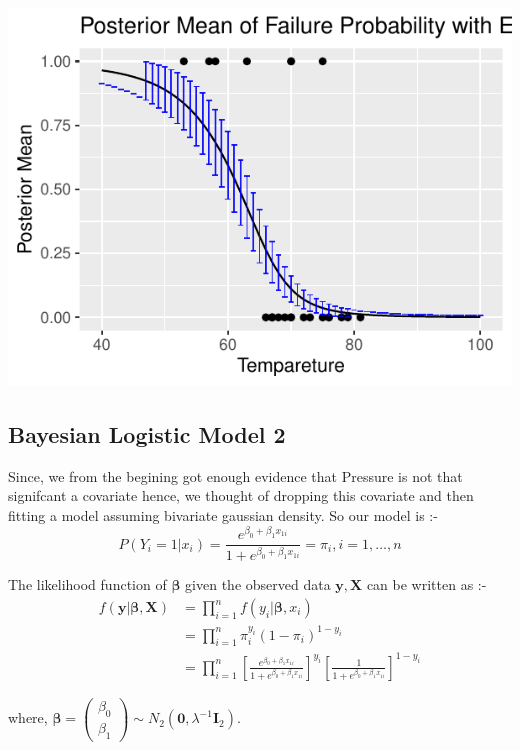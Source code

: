 \documentclass[11pt,english]{article}\usepackage[]{graphicx}\usepackage[]{xcolor}
\makeatletter
\def\maxwidth{ %
  \ifdim\Gin@nat@width>\linewidth
    \linewidth
  \else
    \Gin@nat@width
  \fi
}
\newenvironment{knitrout}{}{} %
\makeatother
\begin{document}
\begin{center}
\begin{knitrout}
\includegraphics[width=\maxwidth]{figure/unnamed-chunk-16-1} 
\end{knitrout}
\par\end{center}
\author{\pagebreak}

\subsection*{Bayesian Logistic Model 2}

Since, we from the begining got enough evidence that Pressure is not
that signifcant a covariate hence, we thought of dropping this covariate
and then fitting a model assuming bivariate gaussian density. So our
model is :-
\[
P\left(Y_{i}=1|x_{i}\right)=\frac{e^{\beta_{0}+\beta_{1}x_{1i}}}{1+e^{\beta_{0}+\beta_{1}x_{1i}}}=\pi_{i},i=1,\dots,n
\]

The likelihood function of $\boldsymbol{\beta}$ given the observed
data $\boldsymbol{y,X}$ can be written as :-
\begin{align*}
f\left(\boldsymbol{y}|\boldsymbol{\beta},\boldsymbol{X}\right) & =\prod_{i=1}^{n}f\left(y_{i}|\boldsymbol{\beta},x_{i}\right)\\
 & =\prod_{i=1}^{n}\pi_{i}^{y_{i}}\left(1-\pi_{i}\right)^{1-y_{i}}\\
 & =\prod_{i=1}^{n}\left[\frac{e^{\beta_{0}+\beta_{1}x_{1i}}}{1+e^{\beta_{0}+\beta_{1}x_{1i}}}\right]^{y_{i}}\left[\frac{1}{1+e^{\beta_{0}+\beta_{1}x_{1i}}}\right]^{1-y_{i}}
\end{align*}

where, $\boldsymbol{\beta}=\begin{pmatrix}\beta_{0}\\
\beta_{1}
\end{pmatrix}\sim N_{2}\left(\boldsymbol{0},\lambda^{-1}\boldsymbol{I}_{2}\right)$.
\end{document}
